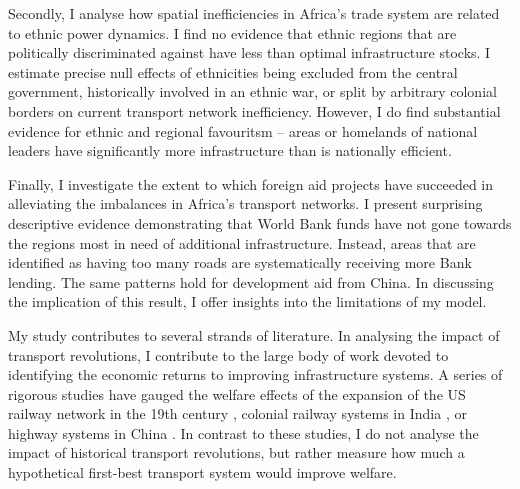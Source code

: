 \documentclass[11pt, oneside]{article}   	%
\begin{document}
Secondly, I analyse how spatial inefficiencies in Africa's trade system are related to ethnic power dynamics. I find no evidence that ethnic regions that are politically discriminated against have less than optimal infrastructure stocks. I estimate precise null effects of ethnicities being excluded from the central government, historically involved in an ethnic war, or split by arbitrary colonial borders \citep{michalopoulos_long-run_2016} on current transport network inefficiency. However, I do find substantial evidence for ethnic and regional favouritsm -- areas or homelands of national leaders have significantly more infrastructure than is nationally efficient.

Finally, I investigate the extent to which foreign aid projects have succeeded in alleviating the imbalances in Africa's transport networks. I present surprising descriptive evidence demonstrating that World Bank funds have not gone towards the regions most in need of additional infrastructure. Instead, areas that are identified as having too many roads are systematically receiving more Bank lending. The same patterns hold for development aid from China. In discussing the implication of this result, I offer insights into the limitations of my model.

My study contributes to several strands of literature. In analysing the impact of transport revolutions, I contribute to the large body of work devoted to identifying the economic returns to improving infrastructure systems. A series of rigorous studies have gauged the welfare effects of the expansion of the US railway network in the 19th century \citep{donaldson_railroads_2016,swisher_reassessing_2017}, colonial railway systems in India \citep{Donaldson_RailroadsRajEstimating_2018,burgess_railroads_2012}, or highway systems in China \citep{faber_trade_2014,baum-snow_roads_2017}. In contrast to these studies, I do not analyse the impact of historical transport revolutions, but rather measure how much a hypothetical first-best transport system would improve welfare.
\end{document}
